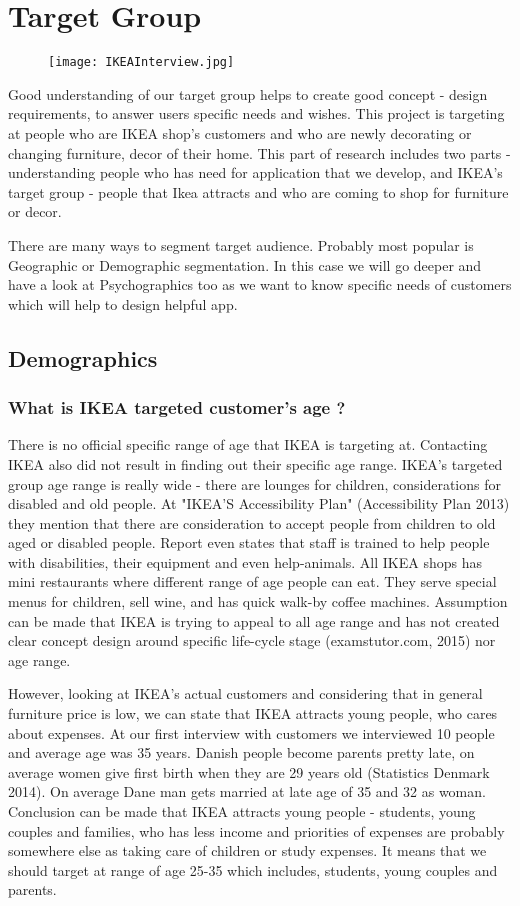 \section{Target Group}
\begin{figure}[H]
\centering
\texttt{[image: IKEAInterview.jpg]}
\end{figure}
Good understanding of our target group helps to create good concept - design requirements, to answer users specific needs and  wishes. 
This project is targeting at people who are IKEA shop's customers and who are newly decorating or changing furniture, decor  of their home. This part of research includes two parts - understanding people who has need for application that we develop, and IKEA's target group - people that Ikea attracts  and who are coming to shop for furniture or decor.

There are many ways to segment target audience. Probably most popular is Geographic or Demographic segmentation. In this case we will go deeper and have a look at Psychographics too as we want to know specific needs of customers which will help to design helpful app. 
\subsection{Demographics }
\subsubsection{What is IKEA targeted customer's age ?}
There is no official specific range of age that IKEA is targeting at. Contacting IKEA also did not result in finding out their specific age range. IKEA's targeted group age range is really wide - there are lounges for children, considerations for disabled and old people. At "IKEA'S Accessibility Plan" (Accessibility Plan 2013) they mention that there are consideration to accept people from children to old aged or disabled people. Report even states that staff is trained to help people with disabilities, their equipment and even help-animals. All IKEA shops has mini restaurants where different range of age people can eat. They serve special menus for children, sell wine, and has quick walk-by coffee machines. Assumption can be made that IKEA is trying to appeal to all age range and has not created clear concept design around specific life-cycle stage (examstutor.com, 2015) nor age range. 

However, looking at IKEA's actual customers and considering that in general furniture price is low, we can state that IKEA attracts young people, who cares about expenses. At our first interview with customers we interviewed 10 people and average age was 35 years. Danish people become parents pretty late, on average women give first birth when they are 29 years old (Statistics Denmark 2014). On average Dane man gets married at late age of 35 and 32 as woman. Conclusion can be made that IKEA attracts young people - students, young couples and families, who has less income and priorities of expenses are probably somewhere else as taking care of children or study expenses. It means that we should target at range of age 25-35 which includes, students, young couples and parents.  
